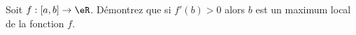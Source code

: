 
\begin{exercice}\label{exoOptimSS0002}

Soit $f:[a,b] \rightarrow \eR$. Démontrez que si $f'(b)>0$ alors $b$ est un maximum local de la fonction $f$.

\end{exercice}
